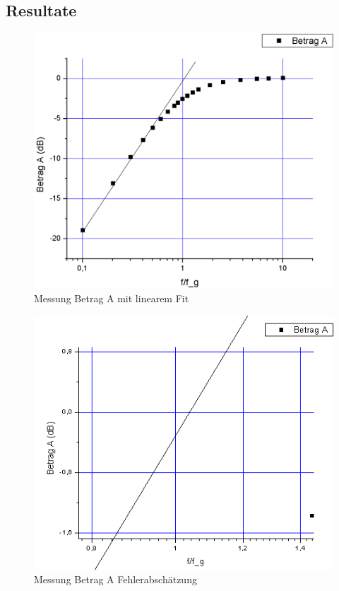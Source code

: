 \documentclass[12pt,a4paper]{article}
\begin{document}
\begin{multicols}{2}
\section{Resultate}
\begin{figure}[H]
	\centering
	\includegraphics[scale=0.25]{./figure/betrag_a.png}
	\caption{Messung Betrag A mit linearem Fit}
	\label{fig:betraga_linfit}
\end{figure}
\begin{figure}[H]
	\centering
	\includegraphics[scale=0.45]{./figure/betrag_a_zoom.png}
	\caption{Messung Betrag A Fehlerabschätzung}
	\label{fig:betraga_abweichung}
\end{figure}


\end{multicols}
\end{document}
